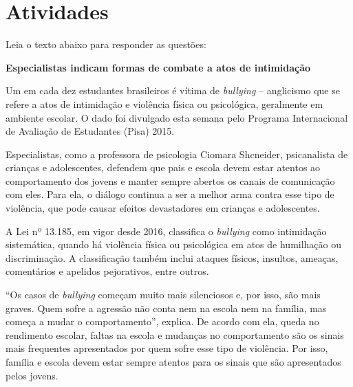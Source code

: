 {%


\section{Atividades}

Leia o texto abaixo para responder as questões:

\begin{myquote}

\textbf{Especialistas indicam formas de combate a atos de intimidação}

Um em cada dez estudantes brasileiros é vítima de \textit{bullying} -- anglicismo
que se refere a atos de intimidação e violência física ou psicológica,
geralmente em ambiente escolar. O dado foi divulgado esta semana pelo
Programa Internacional de Avaliação de Estudantes (Pisa) 2015.

Especialistas, como a professora de psicologia Ciomara Shcneider,
psicanalista de crianças e adolescentes, defendem que pais e escola
devem estar atentos ao comportamento dos jovens e manter sempre abertos
os canais de comunicação com eles. Para ela, o diálogo continua a ser a
melhor arma contra esse tipo de violência, que pode causar efeitos
devastadores em crianças e adolescentes.

A Lei nº 13.185, em vigor desde 2016, classifica o \textit{bullying} como
intimidação sistemática, quando há violência física ou psicológica em
atos de humilhação ou discriminação. A classificação também inclui
ataques físicos, insultos, ameaças, comentários e apelidos pejorativos,
entre outros.

``Os casos de \textit{bullying} começam muito mais silenciosos e, por isso, são
mais graves. Quem sofre a agressão não conta nem na escola nem na
família, mas começa a mudar o comportamento'', explica. De acordo com
ela, queda no rendimento escolar, faltas na escola e mudanças no
comportamento são os sinais mais frequentes apresentados por quem sofre
esse tipo de violência. Por isso, família e escola devem estar sempre
atentos para os sinais que são apresentados pelos jovens.


\end{myquote}}
